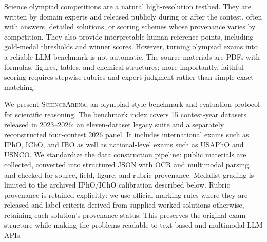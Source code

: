 \documentclass[11pt]{article}
\begin{document}
Science olympiad competitions are a natural high-resolution testbed.
They are written by domain experts and released publicly during or after the contest, often with answers, detailed solutions, or scoring schemes whose provenance varies by competition.
They also provide interpretable human reference points, including gold-medal thresholds and winner scores.
However, turning olympiad exams into a reliable LLM benchmark is not automatic.
The source materials are PDFs with formulas, figures, tables, and chemical structures; more importantly, faithful scoring requires stepwise rubrics and expert judgment rather than simple exact matching.


We present \textsc{ScienceArena}, an olympiad-style benchmark and evaluation protocol for scientific reasoning.
The benchmark index covers 15 contest-year datasets released in 2023--2026: an eleven-dataset legacy suite and a separately reconstructed four-contest 2026 panel. It includes international exams such as IPhO, IChO, and IBO as well as national-level exams such as USAPhO and USNCO.
We standardize the data construction pipeline: public materials are collected, converted into structured JSON with OCR and multimodal parsing, and checked for source, field, figure, and rubric provenance. Medalist grading is limited to the archived IPhO/IChO calibration described below.
Rubric provenance is retained explicitly: we use official marking rules where they are released and label criteria derived from supplied worked solutions otherwise, retaining each solution's provenance status.
This preserves the original exam structure while making the problems readable to text-based and multimodal LLM APIs.
\end{document}
